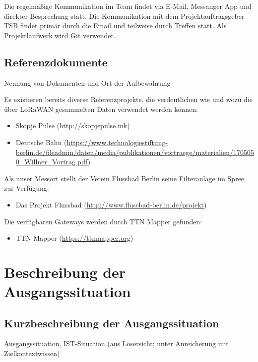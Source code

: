 \documentclass[
11pt,
a4paper,
ngerman,
]{article}
\newcommand{\descriptionWhat}[1]{%
	\begin{itshape}%
	#1 \\%
	\end{itshape}%
}
\begin{document}
Die regelmäßige Kommunikation im Team findet via E-Mail, Messanger App und direkter Besprechung statt. Die Kommunikation mit dem Projektauftragsgeber TSB findet primär durch die Email und teilweise durch Treffen statt.
Als Projektlaufwerk wird Git verwendet.

\subsection{Referenzdokumente}

\descriptionWhat{ Nennung von Dokumenten und Ort der Aufbewahrung }

Es existieren bereits diverse Referenzprojekte, die verdeutlichen wie und wozu die über LoRaWAN gesammelten Daten verwendet werden können:

\begin{itemize}[noitemsep]
	\item Skopje Pulse (\url{http://skopjepulse.mk})
	\item Deutsche Bahn (\url{https://www.technologiestiftung-berlin.de/fileadmin/daten/media/publikationen/vortraege/materialien/1705050_Willner_Vortrag.pdf})
\end{itemize}

Als unser Messort stellt der Verein Flussbad Berlin seine Filteranlage im Spree zur Verfügung:

\begin{itemize}[noitemsep]
	\item Das Projekt Flussbad (\url{http://www.flussbad-berlin.de/projekt})
\end{itemize}

Die verfügbaren Gateways werden durch TTN Mapper gefunden:

\begin{itemize}[noitemsep]
	\item TTN Mapper (\url{https://ttnmapper.org})
\end{itemize}

\newpage

\section{Beschreibung der Ausgangssituation}

\subsection{Kurzbeschreibung der Ausgangssituation}

\descriptionWhat{Ausgangssituation, IST-Situation (aus \glqq Lösersicht\grqq{}; unter Anreicherung mit \glqq Zielkontextwissen\grqq{})}
\end{document}
